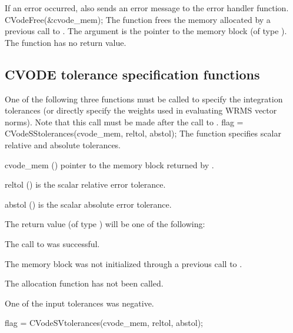 {
  If an error occurred,  also sends an error message to the
  error handler function.
}
{
  CVodeFree(\&cvode\_mem);
}
{
  The function  frees the memory allocated by
  a previous call to .
}
{
  The argument is the pointer to the {\cvode} memory block (of type ).
}
{
  The function  has no return value.
}
{}


\subsection{CVODE tolerance specification functions}\label{sss:cvtolerances}
One of the following three functions must be called to specify the integration
tolerances (or directly specify the weights used in evaluating WRMS vector norms).
Note that this call must be made after the call to .
{
  flag = CVodeSStolerances(cvode\_mem, reltol, abstol);
}
{
  The function  specifies scalar relative and absolute
  tolerances.
}
{
  \begin{args}
  \item[cvode\_mem] ()
    pointer to the {\cvode} memory block returned by .
  \item[reltol] ()
    is the scalar relative error tolerance.
  \item[abstol] ()
    is the scalar absolute error tolerance.
  \end{args}
}
{
  The return value  (of type ) will be one of the following:
  \begin{args}
  \item[\Id{CV\_SUCCESS}]
    The call to  was successful.
  \item[\Id{CV\_MEM\_NULL}]
    The {\cvode} memory block was not initialized through a previous call to
    .
  \item[\Id{CV\_NO\_MALLOC}]
    The allocation function  has not been called.
  \item[\Id{CV\_ILL\_INPUT}]
    One of the input tolerances was negative.
  \end{args}
}
{}
{
  flag = CVodeSVtolerances(cvode\_mem, reltol, abstol);
}
